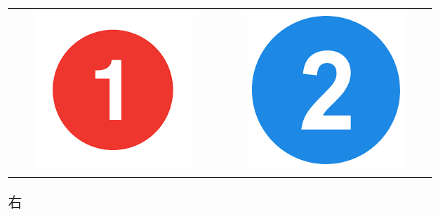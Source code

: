 \documentclass[xelatex,ja=standard,jafont=noto]{bxjsarticle}
\begin{document}
\begin{figure}[h]
    \begin{tabular}{cc}
      \begin{minipage}[t]{0.5\hsize}
        \centering
        \includegraphics[width=0.8\textwidth]{1}
        \caption{左}
        \label{miro1}
      \end{minipage} &
      \begin{minipage}[t]{0.5\hsize}
        \centering
        \includegraphics[width=0.8\textwidth]{2}
        \caption{右}
        \label{miro2}
      \end{minipage}
    \end{tabular}
\end{figure}
\end{document}
